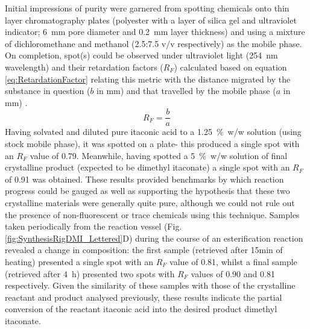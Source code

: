 Initial impressions of purity were garnered from spotting chemicals onto
 thin layer chromatography plates (polyester with a layer of silica gel and
 ultraviolet indicator; 6~\unit{\milli\metre} pore diameter and
 0.2~\unit{\milli\metre} layer thickness) and using a mixture of
 dichloromethane and methanol (2.5:7.5 v/v respectively) as the mobile phase.
On completion, spot(s) could be observed under ultraviolet light
 (254~\unit{\nano\metre} wavelength) and their retardation factors
 (\(R_{F}\)) calculated based on equation \ref{eq:RetardationFactor}
 relating this metric with the distance migrated by the substance in
 question (\(b\) in \unit{\milli\metre}) and that travelled by the
 mobile phase (\(a\) in \unit{\milli\metre}) \cite{Ettre1993}.
\begin{equation}\label{eq:RetardationFactor}
    R_{F}=\frac{b}{a}
\end{equation}
Having solvated and diluted pure itaconic acid to a 1.25~\unit{\percent}~w/w
 solution (using stock mobile phase), it was spotted on a plate- this
 produced a single spot with an \(R_{F}\) value of 0.79.
Meanwhile, having spotted a 5~\unit{\percent}~w/w solution of final
 crystalline product (expected to be dimethyl itaconate) a single spot with
 an \(R_{F}\) of 0.91 was obtained.
These results provided benchmarks by which reaction progress could be
 gauged as well as supporting the hypothesis that these two crystalline
 materials were generally quite pure, although we could not rule out the
 presence of non-fluorescent or trace chemicals using this technique.
Samples taken periodically from the reaction vessel
 (Fig.\ref{fig:SynthesisRigDMI_Lettered}D) during the course of an
 esterification reaction revealed a change in composition: the first sample
 (retrieved after 15\unit{\minute} of heating) presented a single spot with
 an \(R_{F}\) value of 0.81, whilst a final sample (retrieved after 
 4~\unit{\hour}) presented two spots with \(R_{F}\) values of 0.90 and 0.81
 respectively.
Given the similarity of these samples with those of the crystalline
 reactant and product analysed previously, these results indicate the
 partial conversion of the reactant itaconic acid into the desired product
 dimethyl itaconate.

